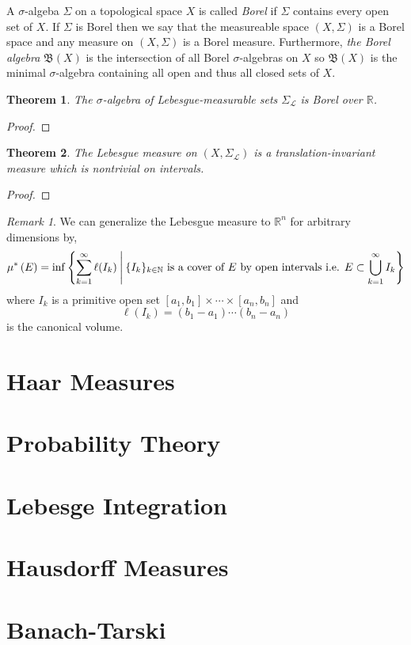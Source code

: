 \documentclass{article}
\newcommand{\N}{\mathbb{N}}
\newcommand{\R}{\mathbb{R}}
\newenvironment{definition}[1][Definition:]{\begin{trivlist}
\item[\hskip \labelsep {\bfseries #1}]}{\end{trivlist}}
\theoremstyle{theorem}
\newtheorem{theorem}{Theorem}[section]
\theoremstyle{definition}
\theoremstyle{definition}
\theoremstyle{remark}
\theoremstyle{definition}
\theoremstyle{remark}
\newtheorem{remark}{Remark}[subsection]
\begin{document}
\begin{definition}
A $\sigma$-algeba $\Sigma$ on a topological space $X$ is called \textit{Borel} if $\Sigma$ contains every open set of $X$. If $\Sigma$ is Borel then we say that the measureable space $(X, \Sigma)$ is a Borel space and any measure on $(X, \Sigma)$ is a Borel measure. Furthermore, \textit{the Borel algebra} $\mathfrak{B}(X)$ is the intersection of all Borel $\sigma$-algebras on $X$ so $\mathfrak{B}(X)$ is the minimal $\sigma$-algebra containing all open and thus all closed sets of $X$.  
\end{definition}

\begin{theorem}
The $\sigma$-algebra of Lebesgue-measurable sets $\Sigma_{\mathcal{L}}$ is Borel over $\R$. 
\end{theorem}

\begin{proof}

\end{proof}

\begin{theorem}
The Lebesgue measure on $(X, \Sigma_{\mathcal{L}})$ is a translation-invariant measure which is nontrivial on intervals. 
\end{theorem}

\begin{proof}

\end{proof}

\begin{remark}
We can generalize the Lebesgue measure to $\R^n$ for arbitrary dimensions by,
\[ \outmeasure{E} = \inf{\left\{ \sum_{k = 1}^{\infty} \ell(I_k) \: \middle| \: \{I_k\}_{k\in\N} \text{ is a cover of } E \text{ by open intervals i.e. } E \subset \bigcup_{k = 1}^\infty I_k \right\}} \]
where $I_k$ is a primitive open set $[a_1, b_1] \times \cdots \times [a_n, b_n]$ and 
\[ \ell(I_k) = (b_1 - a_1) \cdots (b_n - a_n)\]
is the canonical volume. 
\end{remark}

\section{Haar Measures}

\section{Probability Theory}

\section{Lebesge Integration}

\section{Hausdorff Measures}

\section{Banach-Tarski}
\end{document}
